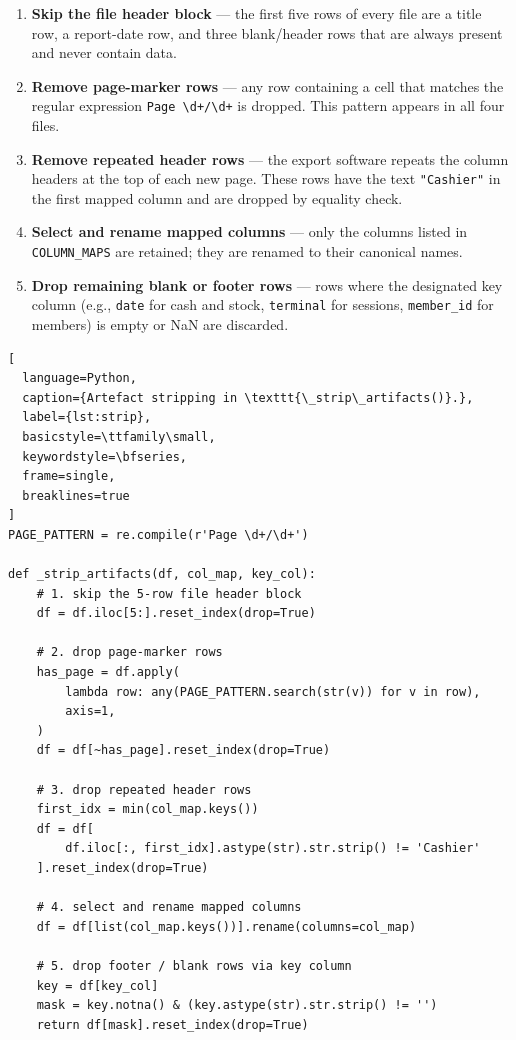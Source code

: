 \begin{enumerate}
  \item \textbf{Skip the file header block} — the first five rows of every file
        are a title row, a report-date row, and three blank/header rows that are
        always present and never contain data.
  \item \textbf{Remove page-marker rows} — any row containing a cell that matches
        the regular expression \texttt{Page~\textbackslash d+/\textbackslash d+}
        is dropped. This pattern appears in all four files.
  \item \textbf{Remove repeated header rows} — the export software repeats the
        column headers at the top of each new page. These rows have the text
        \texttt{"Cashier"} in the first mapped column and are dropped by equality
        check.
  \item \textbf{Select and rename mapped columns} — only the columns listed in
        \texttt{COLUMN\_MAPS} are retained; they are renamed to their canonical names.
  \item \textbf{Drop remaining blank or footer rows} — rows where the designated
        key column (e.g., \texttt{date} for cash and stock, \texttt{terminal} for
        sessions, \texttt{member\_id} for members) is empty or NaN are discarded.
\end{enumerate}

\begin{lstlisting}[
  language=Python,
  caption={Artefact stripping in \texttt{\_strip\_artifacts()}.},
  label={lst:strip},
  basicstyle=\ttfamily\small,
  keywordstyle=\bfseries,
  frame=single,
  breaklines=true
]
PAGE_PATTERN = re.compile(r'Page \d+/\d+')

def _strip_artifacts(df, col_map, key_col):
    # 1. skip the 5-row file header block
    df = df.iloc[5:].reset_index(drop=True)

    # 2. drop page-marker rows
    has_page = df.apply(
        lambda row: any(PAGE_PATTERN.search(str(v)) for v in row),
        axis=1,
    )
    df = df[~has_page].reset_index(drop=True)

    # 3. drop repeated header rows
    first_idx = min(col_map.keys())
    df = df[
        df.iloc[:, first_idx].astype(str).str.strip() != 'Cashier'
    ].reset_index(drop=True)

    # 4. select and rename mapped columns
    df = df[list(col_map.keys())].rename(columns=col_map)

    # 5. drop footer / blank rows via key column
    key = df[key_col]
    mask = key.notna() & (key.astype(str).str.strip() != '')
    return df[mask].reset_index(drop=True)
\end{lstlisting}

